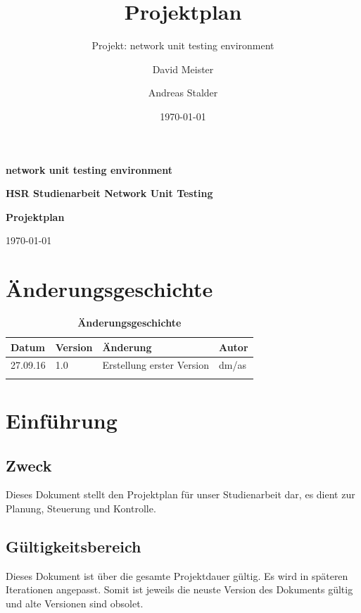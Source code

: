 \documentclass[a4,12pt]{scrartcl}
\title{Projektplan}
\subtitle{Projekt: network unit testing environment}
\author{David Meister \and Andreas Stalder}
\date{\today}
\begin{document}
\begin{titlepage}
	\centering
	\vspace{5cm}
	\begin{center}
	\end{center}
	{\huge\bfseries network unit testing environment\par}
	\vspace{8cm}
	\raggedright
	{\bfseries HSR Studienarbeit Network Unit Testing\par}
	{\huge\bfseries Projektplan\par}
	\vspace{1cm}
	{\theauthor \par}
	{\today\par}

\end{titlepage}

\section{Änderungsgeschichte}

\begin{table}[htb]
\centering
    \begin{tabular}{@{} l l l l@{}}\toprule    
    {Datum} & {Version} & {Änderung} & {Autor}\\ \midrule
    27.09.16 & 1.0 & Erstellung erster Version & dm/as\\ \addlinespace
    \end{tabular}
\caption{\textbf{Änderungsgeschichte}}
\end{table}

\newpage

\tableofcontents
\newpage


\section{Einführung}
\subsection{Zweck}
Dieses Dokument stellt den Projektplan für unser Studienarbeit dar, es dient zur Planung, Steuerung und Kontrolle.
\subsection{Gültigkeitsbereich}
Dieses Dokument ist über die gesamte Projektdauer gültig. Es wird in späteren Iterationen angepasst. Somit ist jeweils die neuste Version des Dokuments gültig und alte Versionen sind obsolet.
\end{document}
